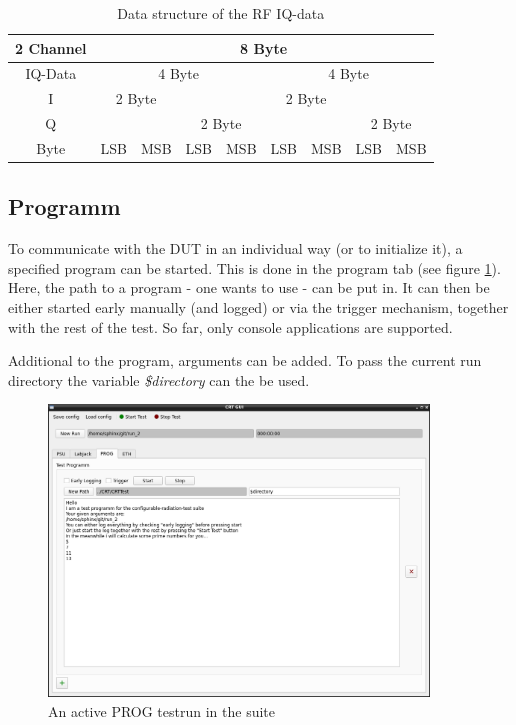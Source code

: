 \documentclass[10pt,a4paper]{article}
\begin{document}
		\begin{table}[H]
		\centering
		\begin{tabular}{c|cc|cc|cc|cc}
		\toprule
		2 Channel	& \multicolumn{8}{c}{8 Byte}\\ \midrule
		IQ-Data		& \multicolumn{4}{c|}{4 Byte} & \multicolumn{4}{c}{4 Byte} \\ \hline 
		I	& \multicolumn{2}{c}{2 Byte} & \multicolumn{2}{c|}{} & \multicolumn{2}{c}{2 Byte} & \multicolumn{2}{c}{} \\ 
		Q	& \multicolumn{2}{c}{} & \multicolumn{2}{c|}{2 Byte} & \multicolumn{2}{c}{} & \multicolumn{2}{c}{2 Byte} \\  \hline
		Byte		& LSB & MSB & LSB & MSB & LSB & MSB & LSB & MSB \\ \bottomrule
		\end{tabular}
		\caption{Data structure of the RF IQ-data}
		\label{t:rf_data}
		\end{table}
		
	\newpage
	
	\subsection{Programm}
	To communicate with the DUT in an individual way (or to initialize it), a specified program can be started. This is done in the program tab (see figure \ref{f:prog_example}). Here, the path to a program - one wants to use - can be put in. It can then be either started early manually (and logged) or via the trigger mechanism, together with the rest of the test. So far, only console applications are supported.
	
	Additional to the program, arguments can be added. To pass the current run directory the variable \textit{\$directory} can the be used.
	
	\begin{figure}[H]
	\centering
	\includegraphics[width=0.9\textwidth]{./7_PROG_example.png}
	\caption{An active PROG testrun in the suite}
	\label{f:prog_example}
	\end{figure}
	
\end{document}
